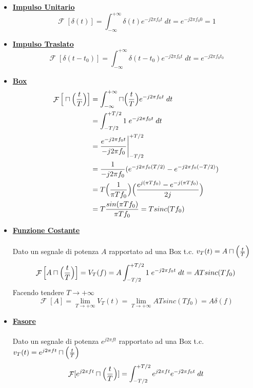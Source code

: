 \documentclass{article}
\newcommand{\Fourier}{\mathop{\mathcal{F}}}
\begin{document}
			\begin{itemize}
				\item \underline{\textbf{Impulso Unitario}} \\
					  \[
					  	\Fourier[\delta(t)] = \int_{-\infty}^{+\infty} {\delta(t) e^{-j2\pi f_0 t}\; dt} = e^{-j2\pi f_0 0} = 1
					  \]
				\item \underline{\textbf{Impulso Traslato}} \\
					  \[
					  	\Fourier[\delta(t - t_0)] = \int_{-\infty}^{+\infty} {\delta(t - t_0) e^{-j2\pi f_0 t}\; dt} = e^{-j2\pi f_0 t_0}
					  \]
				\item \underline{\textbf{Box}} \\
					  \[
					  	\begin{aligned}
					  		\Fourier\Big[\sqcap\Big({t\over{T}}\Big)\Big] &= \int_{-\infty}^{+\infty} {\sqcap\Big({t\over{T}}\Big) e^{-j2\pi f_0 t}\; dt} \\
							&= \int_{-T/2}^{+T/2} {1\; e^{-j2\pi f_0 t}\; dt} \\
							&= {{e^{-j2\pi f_0 t}}\over{-j{2\pi f_0}}}\Bigg\vert_{-T/2}^{+T/2} \\
							&= {{1}\over{-j{2\pi f_0}}} (e^{-j2\pi f_0 (T/2)} - e^{-j2\pi f_0 (-T/2)}) \\
							&= T \Big({{1}\over{\pi T f_0}}\Big) \Big( {{e^{j(\pi T f_0)} - e^{-j(\pi T f_0)}}\over{2j}} \Big) \\
							&= T {{sin(\pi T f_0)}\over{\pi T f_0}} = T sinc(T f_0)
					  	\end{aligned}
					  \]
				\item \underline{\textbf{Funzione Costante}} \\
					  \\
					  Dato un segnale di potenza $ A $ rapportato ad una Box t.c. $ v_T(t) = A\sqcap\Big({t\over{T}}\Big) $
					  \[
					  	\Fourier\Big[A\sqcap\Big({t\over{T}}\Big)\Big] = V_T(f) = A \int_{-T/2}^{+T/2} {1\; e^{-j2\pi f_0 t}\; dt} = AT sinc(Tf_0)
					  \]
					  Facendo tendere $ T \to +\infty $
					  \[
					  	\Fourier[A] = \lim_{T \to +\infty} {V_T(t)} = \lim_{T \to +\infty} {AT sinc(Tf_0)} = A\delta(f)
					  \]
				\item \underline{\textbf{Fasore}} \\
					  \\
					  Dato un segnale di potenza $ e^{j2\pi ft} $ rapportato ad una Box t.c. $ v_T(t) = e^{j2\pi ft}\sqcap\Big({t\over{T}}\Big) $
					  \[
					  	\begin{aligned}
							\Fourier[e^{j2\pi ft}\sqcap\Big({t\over{T}}\Big)] &=  \int_{-T/2}^{+T/2} {e^{j2\pi ft} e^{-j2\pi f_0t}\; dt} \\

\end{aligned}\]
\end{itemize}
\end{document}
